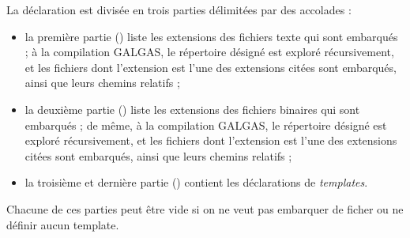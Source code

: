 La déclaration est divisée en trois parties délimitées par des accolades  :
\begin{itemize}
  \item la première partie () liste les extensions des fichiers texte qui sont embarqués ; à la compilation GALGAS, le répertoire désigné est exploré récursivement, et les fichiers dont l'extension est l'une des extensions citées sont embarqués, ainsi que leurs chemins relatifs ;
  \item la deuxième partie () liste les extensions des fichiers binaires qui sont embarqués ; de même, à la compilation GALGAS, le répertoire désigné est exploré récursivement, et les fichiers dont l'extension est l'une des extensions citées sont embarqués, ainsi que leurs chemins relatifs ;
  \item la troisième et dernière partie () contient les déclarations de \emph{templates}.
\end{itemize}

Chacune de ces parties peut être vide si on ne veut pas embarquer de ficher ou ne définir aucun template.


